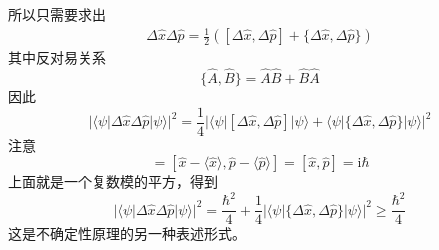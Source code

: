         所以只需要求出
        \begin{equation}\begin{aligned}
            \Delta \hat{x} \Delta \hat{p} = \frac 12([\Delta \hat{x}, \Delta \hat{p}] + \{\Delta \hat{x}, \Delta \hat{p}\})
        \end{aligned}\end{equation}
        其中反对易关系
        \begin{equation}
            \{\hat{A}, \hat{B}\} = \hat{A}\hat{B} + \hat{B}\hat{A}
        \end{equation}
        因此
        \begin{equation}
            |\langle \psi |\Delta \hat{x} \Delta \hat{p}|\psi \rangle|^2 = \frac 14 |\langle \psi |[\Delta \hat{x},\Delta \hat{p}]|\psi \rangle + \langle \psi |\{\Delta \hat{x},\Delta \hat{p}\}|\psi \rangle|^2
        \end{equation}
        注意
        \begin{equation}
            [\Delta \hat{x},\Delta \hat{p}] = [\hat{x}-\langle \hat{x} \rangle, \hat{p}-\langle \hat{p} \rangle ] = [\hat{x},\hat{p}] = \mathrm{i}\hbar
        \end{equation}
        上面就是一个复数模的平方，得到
        \begin{equation}
            |\langle \psi |\Delta \hat{x} \Delta \hat{p}|\psi \rangle|^2 = \frac {\hbar^2}4 + \frac 14 |\langle \psi |\{\Delta \hat{x},\Delta \hat{p}\}|\psi \rangle|^2 \geqslant \frac {\hbar^2}4
        \end{equation}
        这是不确定性原理的另一种表述形式。

